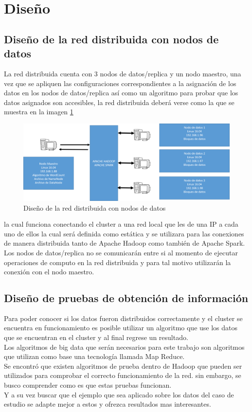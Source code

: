\section{Diseño}
\subsection{Diseño de la red distribuida con nodos de datos}
La red distribuida cuenta con 3 nodos de datos/replica y un nodo maestro, una vez que se apliquen las configuraciones correspondientes a la asignación de los datos en los nodos de datos/replica así como un algoritmo para probar que los datos asignados son accesibles, la red distribuida deberá verse como la que se muestra en la imagen \ref{fig:redi3}
\newpage
\begin{figure}[!htbp]
	\hypertarget{fig:redi3}{\hspace{1pt}}
	\begin{center}
		\includegraphics[width=.7\textwidth]{capitulo4/images/im3.png}
		\caption{Diseño de la red distribuida con nodos de datos}
		\label{fig:redi3}
	\end{center}
\end{figure}
la cual funciona conectando el cluster a una red local que les de una IP a cada uno de ellos la cual será definida como estática y se utilizara para las conexiones de manera distribuida tanto de Apache Hadoop como también de Apache Spark. 
\\
Los nodos de datos/replica no se comunicarán entre si al momento de ejecutar operaciones de computo en la red distribuida y para tal motivo utilizarán la conexión con el nodo maestro.
\\
\subsection{Diseño de pruebas de obtención de información}
Para poder conocer si los datos fueron distribuidos correctamente y el cluster se encuentra en funcionamiento es posible utilizar un algoritmo que use los datos que se encuentran en el cluster y al final regrese un resultado.
\\
Los algoritmos de big data que serán necesarios para este trabajo son algoritmos que utilizan como base una tecnología llamada Map Reduce.
\\
Se encontró que existen algoritmos de prueba dentro de Hadoop que pueden ser utilizados para comprobar el correcto funcionamiento de la red. sin embargo, se busco comprender como es que estas pruebas funcionan.
\\
Y a su vez buscar que el ejemplo que sea aplicado sobre los datos del caso de estudio se adapte mejor a estos y ofrezca resultados mas interesantes.  
\\
